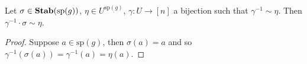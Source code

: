 \documentclass[12pt]{report}
\newtheorem{lem}[thm]{Lemma} \newtheorem{prop}[thm]{Proposition}
\newcommand{\stab}{\text{\textbf{Stab}}}
\newcommand{\sym}{\text{\textbf{Sym}}}
\newcommand{\dom}{\text{\textbf{Dom}}}
\newcommand{\consp}{\text{sp}}
\newcommand{\spstab}[1]{\stab (\consp (#1))}
\begin{document}




\begin{claim}
  Let $\sigma \in \spstab{g}$, $\eta \in U^{\underline{\consp(g)}}$, $\gamma: U
  \rightarrow [n]$ a bijection such that $\gamma^{-1} \sim \eta$. Then
  $\gamma^{-1} \cdot \sigma \sim \eta$.
\end{claim}
\begin{proof}
  Suppose $a \in \consp(g)$, then $\sigma (a) = a$ and so $\gamma^{-1} (\sigma
  (a)) = \gamma^{-1} (a) = \eta (a)$.
\end{proof}
\end{document}
